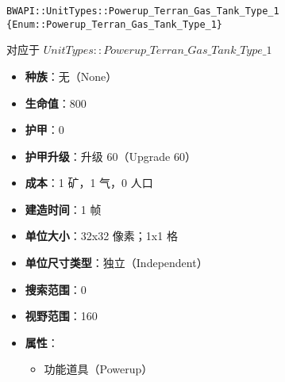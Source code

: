 \begin{tcolorbox}[colback=white, colframe=black!60!white, title=Powerup\_Terran\_Gas\_Tank\_Type\_1(), arc=0mm]
    \begin{verbatim}
BWAPI::UnitTypes::Powerup_Terran_Gas_Tank_Type_1 {Enum::Powerup_Terran_Gas_Tank_Type_1}
    \end{verbatim}
    对应于  $UnitTypes::Powerup\_Terran\_Gas\_Tank\_Type\_1$ 
    \begin{itemize}
        \item \textbf{种族}：无（None）
        \item \textbf{生命值}：800
        \item \textbf{护甲}：0
        \item \textbf{护甲升级}：升级 60（Upgrade 60）
        \item \textbf{成本}：1 矿，1 气，0 人口
        \item \textbf{建造时间}：1 帧
        \item \textbf{单位大小}：32x32 像素；1x1 格
        \item \textbf{单位尺寸类型}：独立（Independent）
        \item \textbf{搜索范围}：0
        \item \textbf{视野范围}：160
        \item \textbf{属性}：
            \begin{itemize}
                \item 功能道具（Powerup）
            \end{itemize}
    \end{itemize}
\end{tcolorbox}

